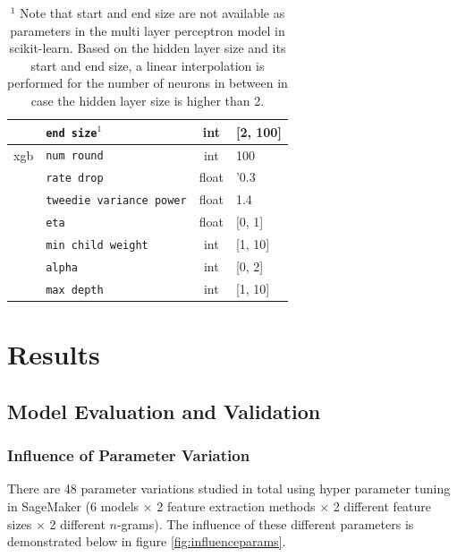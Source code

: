 \documentclass[a4paper,12pt,nottoc]{article}
\begin{document}
\begin{table}[h]
\begin{center}
\begin{tabular}{| c | l | c | l |}
& \texttt{end size}$^\textrm{1}$ & int & [2, 100] \\
\hline 
xgb \cite{bib:xgb} & \texttt{num round} & int & 100 \\
& \texttt{rate drop} & float & '0.3 \\
& \texttt{tweedie variance power} & float & 1.4 \\
& \texttt{eta} & float & [0, 1] \\
& \texttt{min child weight} & int & [1, 10] \\
& \texttt{alpha} & int & [0, 2] \\
& \texttt{max depth} & int & [1, 10] \\
\hline 
\end{tabular}
\caption{$^\textrm{1}$ Note that start and end size are not available as parameters in the multi layer perceptron model in scikit-learn. Based on the hidden layer size and its start and end size, a linear interpolation is performed for the number of neurons in between in case the hidden layer size is higher than 2.}\label{tab:hyperparam}
\end{center}
\end{table}

\clearpage
\section{Results}

\subsection{Model Evaluation and Validation}

\subsubsection{Influence of Parameter Variation}

There are 48 parameter variations studied in total using hyper parameter tuning in SageMaker \cite{bib:sagemaker} (6 models $\times$ 2 feature extraction methods $\times$ 2 different feature sizes $\times$ 2 different $n$-grams). The influence of these different parameters is demonstrated below in figure \ref{fig:influenceparams}.
\end{document}
